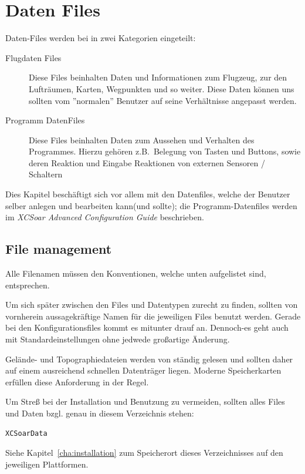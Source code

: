 \chapter{Daten  Files}\label{cha:data-files}
Daten-Files werden bei \xc in zwei Kategorien eingeteilt:
\begin{description}
\item[Flugdaten Files ] Diese Files beinhalten Daten und Informationen zum Flugzeug, zur den
    Lufträumen, Karten, Wegpunkten und so weiter.  Diese Daten können uns sollten vom ''normalen''
    Benutzer auf seine Verhältnisse angepasst werden.
\item[Programm DatenFiles] Diese Files beinhalten Daten zum Aussehen und Verhalten des
    Programmes. Hierzu gehören z.B.\ Belegung von Tasten und Buttons, sowie deren Reaktion und
    Eingabe Reaktionen von externen Sensoren / Schaltern
\end{description}
Dies Kapitel beschäftigt sich vor allem mit den Datenfiles, welche der Benutzer selber anlegen und
bearbeiten kann(und sollte);  die Programm-Datenfiles werden im {\em XCSoar Advanced Configuration
Guide} beschrieben.


\section{File management}
Alle Filenamen müssen den Konventionen, welche unten aufgelistet sind, entsprechen.

Um sich später zwischen den Files und Datentypen zurecht zu finden, sollten von vornherein
aussagekräftige Namen für die jeweiligen Files benutzt werden. Gerade bei den Konfigurationsfiles
kommt es mitunter drauf an. Dennoch-es geht auch mit Standardeinstellungen ohne jedwede großartige
Änderung.

Gelände- und Topographiedateien werden von \xc ständig gelesen und
sollten daher auf einem ausreichend schnellen Datenträger liegen.
Moderne Speicherkarten erfüllen diese Anforderung in der Regel.

Um Streß bei der Installation und Benutzung zu vermeiden, sollten alles Files und Daten bzgl. \xc  genau in
diesem Verzeichnis stehen:

\begin{verbatim}
XCSoarData
\end{verbatim}

Siehe Kapitel~\ref{cha:installation} zum Speicherort dieses Verzeichnisses auf den jeweiligen Plattformen.

